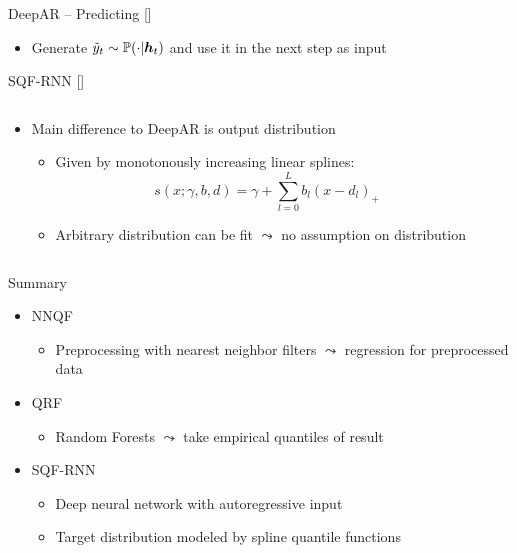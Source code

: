 \documentclass[10pt,aspectratio=169]{beamer}
\begin{document}
\begin{frame}[fragile]{DeepAR -- Predicting [\cite{Salinas2020}]}
    \begin{center}
        
    \end{center}
    \begin{itemize}
        \item Generate \(\tilde{y}_t \sim \P(\cdot | \boldsymbol{h}_t)\) and use it in the next step as input
    \end{itemize}
\end{frame}

\begin{frame}{SQF-RNN [\cite{Gasthaus2019}]}
    \begin{columns}
    \begin{column}{0.6\textwidth}
    \begin{itemize}
        \item Main difference to DeepAR is output distribution
        \begin{itemize}
            \item Given by monotonously increasing linear splines: 
            \[ s(x; \gamma, b, d) = \gamma + \sum_{l=0}^L b_l (x - d_l)_+ \]
            \item Arbitrary distribution can be fit \(\leadsto\) no assumption on distribution
        \end{itemize}
    \end{itemize}
    \end{column}

    \begin{column}{0.35\textwidth}
        
    \end{column}
    \end{columns}
\end{frame}

\begin{frame}{Summary}
    \begin{itemize}
        \item NNQF
        \begin{itemize}
            \item Preprocessing with nearest neighbor filters \(\leadsto\) regression for preprocessed data
        \end{itemize}
        \item QRF
        \begin{itemize}
            \item Random Forests \(\leadsto\) take empirical quantiles of result
        \end{itemize}
        \item SQF-RNN
        \begin{itemize}
            \item Deep neural network with autoregressive input
            \item Target distribution modeled by spline quantile functions
        \end{itemize}
    \end{itemize}
\end{frame}
\end{document}

